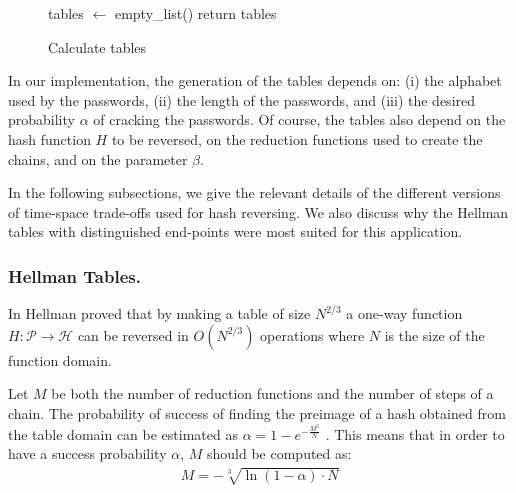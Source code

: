 \documentclass{llncs}
\def \CalH {\mathcal{H}}
\def \CalP {\mathcal{P}}
\begin{document}
\begin{figure} [ht]
\vspace{-0.5 cm}
\begin{algorithm}[H]
  \caption{Calculate tables}
\label{algo:tables_calculation}\DontPrintSemicolon



  tables $\gets$ empty\_list() \;
  \For{$i \in [0,M)$}{
    table $\gets$ new array(size = $\alpha \cdot M$, default = EMPTY\_ENTRY) \;
    chain\_count $\gets 0$ \;
    chain\_index $\gets 0$ \;
    \While{\emph{chain\_count} $ < M $}{
      end $\gets$ calculate\_end\_point(redfun(index), password\_for(chain\_index)) \;
      bucket\_idx $\gets$ bucket\_for(end) \;
      \If{\emph{table[bucket\_idx] == EMPTY\_ENTRY}}{
        bucket\_idx = (chain\_index, end) \;
        chain\_count += $1$ \;
      }
      chain\_index += $1$ \;
    }
    tables.append(table) \;
	}
  return tables \;
\end{algorithm}
\vspace{-0.5 cm}
\end{figure}


In our implementation, the generation of the tables depends on:
(i) the alphabet used by the passwords, 
(ii) the length of the passwords,
and (iii) the desired probability $\alpha$ of cracking the passwords.
Of course, the tables also depend on the hash function $H$ to be reversed,
on the reduction functions used to create the chains,
and on the parameter $\beta$.


In the following subsections, we give the relevant details 
of the different versions of time-space trade-offs used for hash reversing.
We also discuss why the Hellman tables with distinguished end-points
were most suited for this application.


\subsubsection{Hellman Tables.}

In \cite{paper:h-80} Hellman proved that by making a table
of size $N^{2/3}$ a one-way function $H : \CalP \rightarrow \CalH$ 
can be reversed in $O(N^{2/3})$
operations where $N$ is the size of the function domain.

Let $M$ be both the number of reduction functions and the
number of steps of a chain. The probability of success of finding the preimage
of a hash obtained from the table domain can be estimated as 
$\alpha = 1-e^{-\frac{M^{3}}{N}}$ \cite{paper:o-03}. 
This means that in order to have a success probability
$\alpha$, $M$ should be computed as: 
\begin{align} \label{eq:m}
M = -\sqrt[3]{ \ln(1-\alpha) \cdot N}
\end{align}
\end{document}
